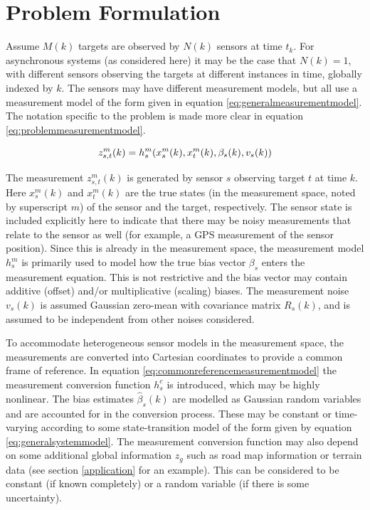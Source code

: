 \documentclass[journal]{IEEEtran}
\begin{document}
\section{Problem Formulation} \label{problemstatement}
Assume $M(k)$ targets are observed by $N(k)$ sensors at time $t_k$. For asynchronous systems (as considered here) it may be the case that $N(k) = 1$, with different sensors observing the targets at different instances in time, globally indexed by $k$. The sensors may have different measurement models, but all use a measurement model of the form given in equation \ref{eq:generalmeasurementmodel}. The notation specific to the problem is made more clear in equation \ref{eq:problemmeasurementmodel}.

\begin{equation}
    z_{s,t}^m(k) = h_s^m(x_s^m(k), x_t^m(k), \beta_s(k), v_s(k)) \\
\label{eq:problemmeasurementmodel}
\end{equation}

The measurement $z_{s,t}^m(k)$ is generated by sensor $s$ observing target $t$ at time $k$. Here $x_s^m(k)$ and $x_t^m(k)$ are the true states (in the measurement space, noted by superscript $m$) of the sensor and the target, respectively. The sensor state is included explicitly here to indicate that there may be noisy measurements that relate to the sensor as well (for example, a GPS measurement of the sensor position). Since this is already in the measurement space, the measurement model $h_s^m$ is primarily used to model how the true bias vector $\beta_{s}$ enters the measurement equation. This is not restrictive and the bias vector may contain additive (offset) and/or multiplicative (scaling) biases. The measurement noise $v_s(k)$ is assumed Gaussian zero-mean with covariance matrix $R_s(k)$, and is assumed to be independent from other noises considered.

To accommodate heterogeneous sensor models in the measurement space, the measurements are converted into Cartesian coordinates to provide a common frame of reference. In equation \ref{eq:commonreferencemeasurementmodel} the measurement conversion function $h_s^c$ is introduced, which may be highly nonlinear. The bias estimates $\hat{\beta}_s(k)$ are modelled as Gaussian random variables and are accounted for in the conversion process. These may be constant or time-varying according to some state-transition model of the form given by equation \ref{eq:generalsystemmodel}. The measurement conversion function may also depend on some additional global information $z_g$ such as road map information or terrain data (see section \ref{application} for an example). This can be considered to be constant (if known completely) or a random variable (if there is some uncertainty).
\end{document}
